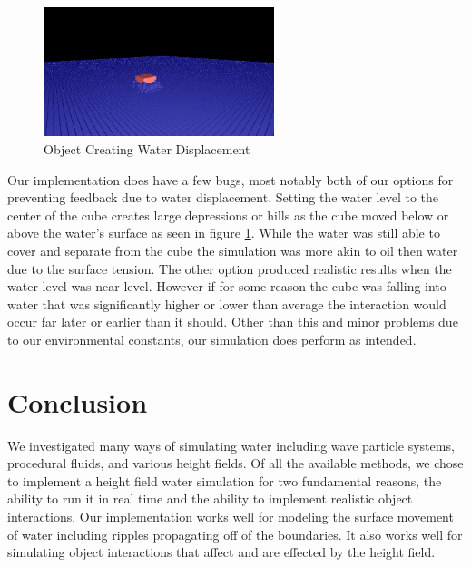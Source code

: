 \documentclass[11pt]{article}
\begin{document}
\begin{figure}[H]
    \caption{Object Creating Water Displacement}
    \label{fig:displacement}
    \centering
    \includegraphics[width=0.6\textwidth]{../www/images/objectWaterDisplacement}
\end{figure}

Our implementation does have a few bugs, most notably both of our options for 
preventing feedback due to water displacement. Setting the water level to the 
center of the cube creates large depressions or hills as the cube moved below 
or above the water’s surface as seen in figure \ref{fig:displacement}. While 
the water was still able to cover and separate from the cube the simulation was 
more akin to oil then water due to the surface tension. The other option 
produced realistic results when the water level was near level. However if for 
some reason the cube was falling into water that was significantly higher or 
lower than average the interaction would occur far later or earlier than it 
should. Other than this and minor problems due to our environmental constants, 
our simulation does perform as intended.

\section{Conclusion}

We investigated many ways of simulating water including wave particle systems, 
procedural fluids, and various height fields. Of all the available methods, we 
chose to implement a height field water simulation for two fundamental reasons, 
the ability to run it in real time and the ability to implement realistic 
object interactions. Our implementation works well for modeling the surface 
movement of water including ripples propagating off of the boundaries. It also 
works well for simulating object interactions that affect and are effected by 
the height field.
\end{document}
